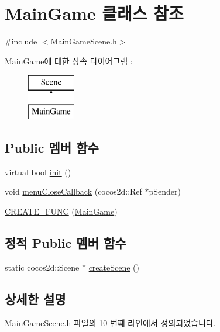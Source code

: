 \hypertarget{class_main_game}{}\section{Main\+Game 클래스 참조}
\label{class_main_game}


{\ttfamily \#include $<$Main\+Game\+Scene.\+h$>$}

Main\+Game에 대한 상속 다이어그램 \+: \begin{figure}[H]
\begin{center}
\leavevmode
\includegraphics[height=2.000000cm]{class_main_game}
\end{center}
\end{figure}
\subsection*{Public 멤버 함수}
\begin{DoxyCompactItemize}
\item 
virtual bool \hyperlink{class_main_game_ab518edeb854c0447539b829790397dc6}{init} ()
\item 
void \hyperlink{class_main_game_a824206defd2b5af2359c3699aa55e289}{menu\+Close\+Callback} (cocos2d\+::\+Ref $\ast$p\+Sender)
\item 
\hyperlink{class_main_game_a1375b18a8348eb5a58aea4fd678fbad6}{C\+R\+E\+A\+T\+E\+\_\+\+F\+U\+NC} (\hyperlink{class_main_game}{Main\+Game})
\end{DoxyCompactItemize}
\subsection*{정적 Public 멤버 함수}
\begin{DoxyCompactItemize}
\item 
static cocos2d\+::\+Scene $\ast$ \hyperlink{class_main_game_a4d902c709107b834b3cb1dcb8debc1aa}{create\+Scene} ()
\end{DoxyCompactItemize}


\subsection{상세한 설명}


Main\+Game\+Scene.\+h 파일의 10 번째 라인에서 정의되었습니다.



